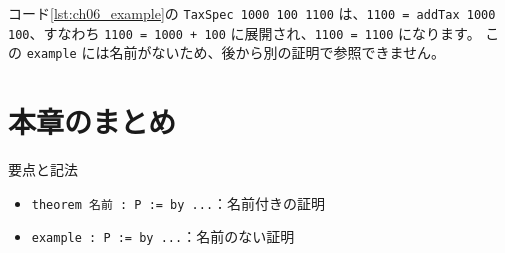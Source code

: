 コード\ref{lst:ch06_example}の \texttt{TaxSpec 1000 100 1100} は、\texttt{1100 = addTax 1000 100}、すなわち \texttt{1100 = 1000 + 100} に展開され、\texttt{1100 = 1100} になります。
この \texttt{example} には名前がないため、後から別の証明で参照できません。

\section{本章のまとめ}

要点と記法
\begin{itemize}
\item \texttt{theorem 名前 : P := by ...}：名前付きの証明
\item \texttt{example : P := by ...}：名前のない証明
\end{itemize}
